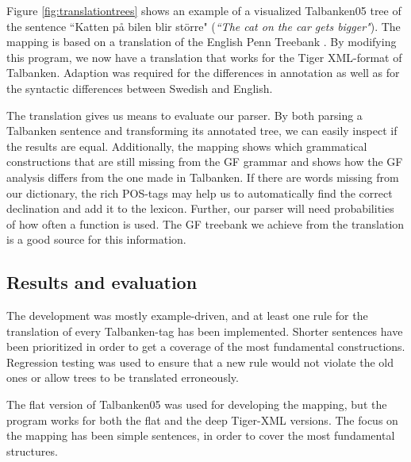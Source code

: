 \documentclass[10pt, a4paper]{article}
\begin{document}
Figure \ref{fig:translationtrees} shows an example of a visualized Talbanken05 tree
of the sentence ``Katten p{\aa} bilen blir st{\"o}rre" 
(\emph{``The cat on the car gets bigger"}).
The mapping is based on 
a translation of the English Penn Treebank \cite{gfpenn}.
By modifying this program, we now have a translation that works for
the Tiger XML-format of
Talbanken. Adaption was required for the differences in annotation as well as 
for the syntactic differences between Swedish and English.

The translation 
gives us means to evaluate our parser. By both parsing a Talbanken sentence and
transforming its annotated tree, we can easily inspect if the results are
equal.
Additionally, the mapping shows which grammatical constructions that are still missing
from the GF grammar and shows how the GF analysis differs from the one made
in Talbanken.
If there are words missing from our dictionary, the rich
POS-tags may help us to automatically find the correct declination and add it to the
lexicon. Further, our parser will need probabilities of how often a function is
used. The GF treebank we achieve from the translation is a good source for this
information.\\

\subsection{Results and evaluation}
The development was mostly example-driven, and at least one rule for the translation of
every Talbanken-tag has been implemented.
Shorter sentences have been prioritized in order to get a coverage of the most
fundamental constructions. 
Regression testing was used to ensure that a new rule would not violate the old ones
or allow trees to be translated erroneously.


The flat version of Talbanken05 was used for developing the mapping, but
the program works for both the flat and the deep Tiger-XML versions.
The focus on the mapping has been simple sentences, in order to cover the most
fundamental structures. 
\end{document}
